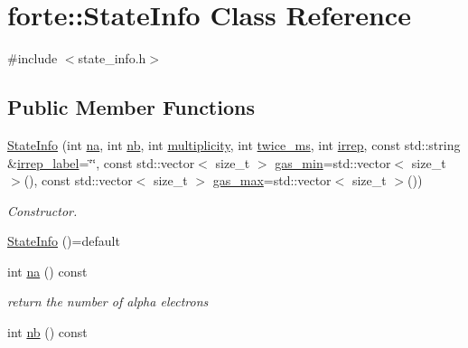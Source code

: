 \hypertarget{classforte_1_1_state_info}{}\section{forte\+:\+:State\+Info Class Reference}
\label{classforte_1_1_state_info}


{\ttfamily \#include $<$state\+\_\+info.\+h$>$}

\subsection*{Public Member Functions}
\begin{DoxyCompactItemize}
\item 
\mbox{\hyperlink{classforte_1_1_state_info_a7a372828466d8512e7a6a046b0f2c105}{State\+Info}} (int \mbox{\hyperlink{classforte_1_1_state_info_ae4ee75f5eab9ec0eafc0d93f2c275da3}{na}}, int \mbox{\hyperlink{classforte_1_1_state_info_a87ccf3fb2799d0fad2867625d72e2a85}{nb}}, int \mbox{\hyperlink{classforte_1_1_state_info_a3cfa6b9cf9cb9b22ba3c087cf46e8ce1}{multiplicity}}, int \mbox{\hyperlink{classforte_1_1_state_info_aecba70ee7401a519978f6960637175e8}{twice\+\_\+ms}}, int \mbox{\hyperlink{classforte_1_1_state_info_a6fc39a9719c18b179d9ab83992990e31}{irrep}}, const std\+::string \&\mbox{\hyperlink{classforte_1_1_state_info_a8f5882f7c4b51f1bb43da3b4038763a1}{irrep\+\_\+label}}=\char`\"{}\char`\"{}, const std\+::vector$<$ size\+\_\+t $>$ \mbox{\hyperlink{classforte_1_1_state_info_afead0369c4c893b73c1e22c020358f6c}{gas\+\_\+min}}=std\+::vector$<$ size\+\_\+t $>$(), const std\+::vector$<$ size\+\_\+t $>$ \mbox{\hyperlink{classforte_1_1_state_info_a7f87e4ae590b1e723fd2cab3a29673fd}{gas\+\_\+max}}=std\+::vector$<$ size\+\_\+t $>$())
\begin{DoxyCompactList}\small\item\em Constructor. \end{DoxyCompactList}\item 
\mbox{\hyperlink{classforte_1_1_state_info_aec2282c090c68fc2acfa2195d038ada4}{State\+Info}} ()=default
\item 
int \mbox{\hyperlink{classforte_1_1_state_info_ae4ee75f5eab9ec0eafc0d93f2c275da3}{na}} () const
\begin{DoxyCompactList}\small\item\em return the number of alpha electrons \end{DoxyCompactList}\item 
int \mbox{\hyperlink{classforte_1_1_state_info_a87ccf3fb2799d0fad2867625d72e2a85}{nb}} () const

\end{DoxyCompactItemize}
